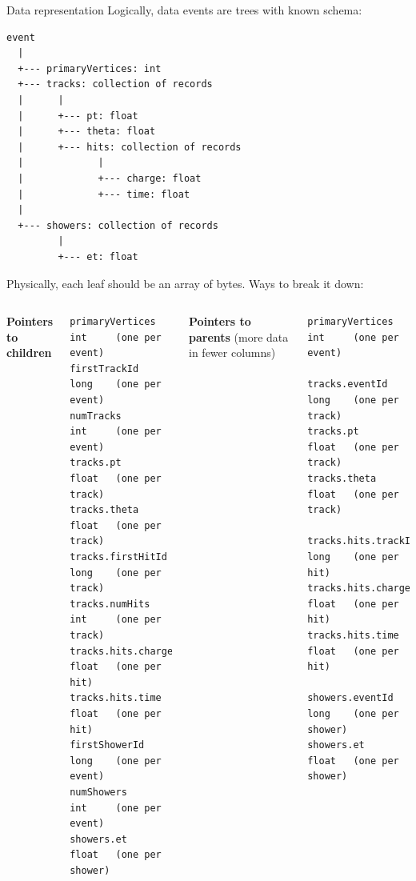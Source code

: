 \documentclass{beamer}
\begin{document}
\begin{frame}[fragile]{Data representation}
\vspace{0.45 cm}
\small
\hspace{-0.35 cm}Logically, data events are trees with known schema:
\tiny
\begin{center}
\begin{minipage}{0.5\linewidth}
\begin{verbatim}
event
  |
  +--- primaryVertices: int
  +--- tracks: collection of records
  |      |
  |      +--- pt: float
  |      +--- theta: float
  |      +--- hits: collection of records
  |             |
  |             +--- charge: float
  |             +--- time: float
  |
  +--- showers: collection of records
         |
         +--- et: float
\end{verbatim}
\end{minipage}
\end{center}

\small
\hspace{-0.35 cm}Physically, each leaf should be an array of bytes. Ways to break it down:

\vspace{0.25 cm}
\tiny
\begin{columns}[t]
{\bf Pointers to children}

\vspace{-0.35 cm}
\begin{verbatim}
primaryVertices      int     (one per event)
firstTrackId         long    (one per event)
numTracks            int     (one per event)
tracks.pt            float   (one per track)
tracks.theta         float   (one per track)
tracks.firstHitId    long    (one per track)
tracks.numHits       int     (one per track)
tracks.hits.charge   float   (one per hit)
tracks.hits.time     float   (one per hit)
firstShowerId        long    (one per event)
numShowers           int     (one per event)
showers.et           float   (one per shower)
\end{verbatim}

{\bf Pointers to parents} (more data in fewer columns)

\vspace{-0.35 cm}
\begin{verbatim}
primaryVertices      int     (one per event)

tracks.eventId       long    (one per track)
tracks.pt            float   (one per track)
tracks.theta         float   (one per track)

tracks.hits.trackId  long    (one per hit)
tracks.hits.charge   float   (one per hit)
tracks.hits.time     float   (one per hit)

showers.eventId      long    (one per shower)
showers.et           float   (one per shower)
\end{verbatim}
\end{columns}
\end{frame}
\end{document}
